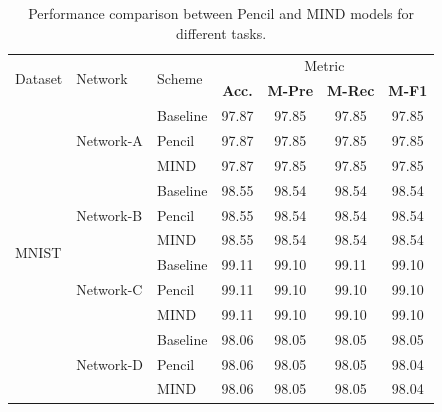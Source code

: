 \documentclass[conference]{IEEEtran}
\begin{document}
\begin{table}[ht]
\centering
\caption{Performance comparison between Pencil and MIND models for different tasks.}
\begin{tabular}{ l|l|l | c c c c } 
\hline
\multirow{2}{*}{Dataset} & \multirow{2}{*}{Network} & \multirow{2}{*}{Scheme} & \multicolumn{4}{c}{Metric} \\ 
\cline{4-7}
                      &                        &                        & \textbf{Acc.} & \textbf{M-Pre} & \textbf{M-Rec} & \textbf{M-F1} \\ 
\hline
\multirow{12}{*}{MNIST}   & \multirow{3}{*}{Network-A}  
                         & Baseline & 97.87 & 97.85 & 97.85 & 97.85 \\ 
                         &           & Pencil & 97.87 & 97.85 & 97.85 & 97.85 \\ 
                         &            & MIND    & 97.87 & 97.85 & 97.85 & 97.85 \\ 
\cline{2-7}
                      & \multirow{3}{*}{Network-B}
                      & Baseline & 98.55 & 98.54 & 98.54 & 98.54 \\
                      &           & Pencil & 98.55 & 98.54 & 98.54 & 98.54 \\ 
                      &            & MIND    & 98.55 & 98.54 & 98.54 & 98.54 \\ 
\cline{2-7}
                      & \multirow{3}{*}{Network-C}    
                      & Baseline & 99.11 & 99.10 & 99.11 & 99.10 \\
                      &          & Pencil & 99.11 & 99.10 & 99.10 & 99.10 \\ 
                      &            & MIND    & 99.11 & 99.10 & 99.10 & 99.10 \\ 
\cline{2-7}
                      & \multirow{3}{*}{Network-D}
                      & Baseline & 98.06 & 98.05 & 98.05 & 98.05 \\
                      &         & Pencil & 98.06 & 98.05 & 98.05 & 98.04 \\ 
                      &            & MIND    & 98.06 & 98.05 & 98.05 & 98.04 \\ 
\hline
                    

\end{tabular}
\end{table}
\end{document}
